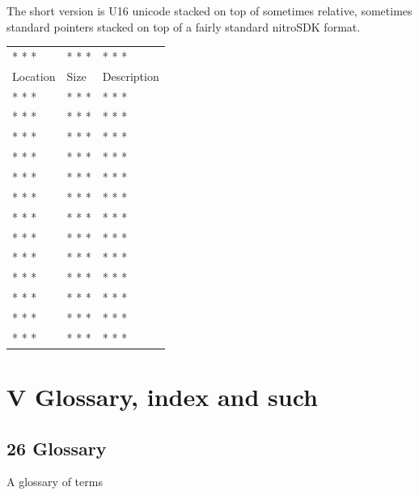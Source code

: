 \documentclass[
]{book}
\begin{document}
The short version is U16 unicode stacked on top of sometimes relative, sometimes standard pointers stacked on top of a fairly standard nitroSDK format.

\begin{longtable}[]{@{}lll@{}}
\toprule()
\endhead
* * * & * * * & * * * \\
Location & Size & Description \\
* * * & * * * & * * * \\
* * * & * * * & * * * \\
* * * & * * * & * * * \\
* * * & * * * & * * * \\
* * * & * * * & * * * \\
* * * & * * * & * * * \\
* * * & * * * & * * * \\
* * * & * * * & * * * \\
* * * & * * * & * * * \\
* * * & * * * & * * * \\
* * * & * * * & * * * \\
* * * & * * * & * * * \\
* * * & * * * & * * * \\
\bottomrule()
\end{longtable}

\hypertarget{part-v-glossary-index-and-such}{%
\part{V Glossary, index and such}\label{part-v-glossary-index-and-such}}

\hypertarget{glossary}{%
\chapter{26 Glossary}\label{glossary}}

A glossary of terms
\end{document}
